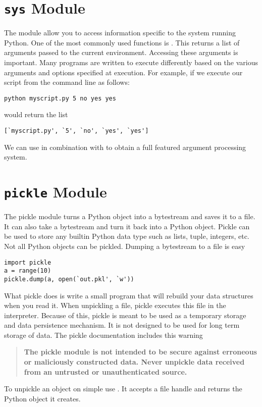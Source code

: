 \section*{\texttt{sys} Module}
The  module allow you to access information specific to the system running Python.
One of the most commonly used functions is .
This returns a list of arguments passed to the current environment.
Accessing these arguments is important.
Many programs are written to execute differently based on the various arguments and options specified at execution.
For example, if we execute our script from the command line as follows:
\begin{verbatim}
python myscript.py 5 no yes yes
\end{verbatim}
 would return the list
\begin{verbatim}
[`myscript.py', `5', `no', `yes', `yes']
\end{verbatim}
We can use  in combination with  to obtain a full featured argument processing system.

\section*{\texttt{pickle} Module}
The pickle module turns a Python object into a bytestream and saves it to a file.
It can also take a bytestream and turn it back into a Python object.
Pickle can be used to store any builtin Python data type such as lists, tuple, integers, etc.
Not all Python objects can be pickled.
Dumping a bytestream to a file is easy
\begin{lstlisting}
import pickle
a = range(10)
pickle.dump(a, open(`out.pkl', `w'))
\end{lstlisting}
What pickle does is write a small program that will rebuild your data structures when you read it.
When unpickling a file, pickle executes this file in the interpreter.
Because of this, pickle is meant to be used as a temporary storage and data persistence mechanism.
It is not designed to be used for long term storage of data.
The pickle documentation includes this warning
\begin{quote}
\textbf{The pickle module is not intended to be secure against erroneous or maliciously constructed data. Never unpickle data received from an untrusted or unauthenticated source.}
\end{quote}
To unpickle an object on simple use .
It accepts a file handle and returns the Python object it creates.

